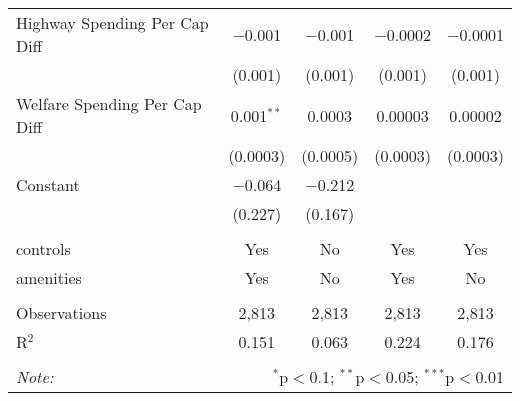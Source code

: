 \begin{table}[!htbp]
\begin{tabular}{@{\extracolsep{5pt}}lcccc}
  Highway Spending Per Cap Diff & $-$0.001 & $-$0.001 & $-$0.0002 & $-$0.0001 \\ 
  & (0.001) & (0.001) & (0.001) & (0.001) \\ 
  Welfare Spending Per Cap Diff & 0.001$^{**}$ & 0.0003 & 0.00003 & 0.00002 \\ 
  & (0.0003) & (0.0005) & (0.0003) & (0.0003) \\ 
  Constant & $-$0.064 & $-$0.212 &  &  \\ 
  & (0.227) & (0.167) &  &  \\ 
 \hline \\[-1.8ex] 
controls & Yes & No & Yes & Yes \\ 
amenities & Yes & No & Yes & No \\ 
\hline \\[-1.8ex] 
Observations & 2,813 & 2,813 & 2,813 & 2,813 \\ 
R$^{2}$ & 0.151 & 0.063 & 0.224 & 0.176 \\ 
\hline 
\hline \\[-1.8ex] 
\textit{Note:}  & \multicolumn{4}{r}{$^{*}$p$<$0.1; $^{**}$p$<$0.05; $^{***}$p$<$0.01} \\ 
\end{tabular} 
\end{table} 
